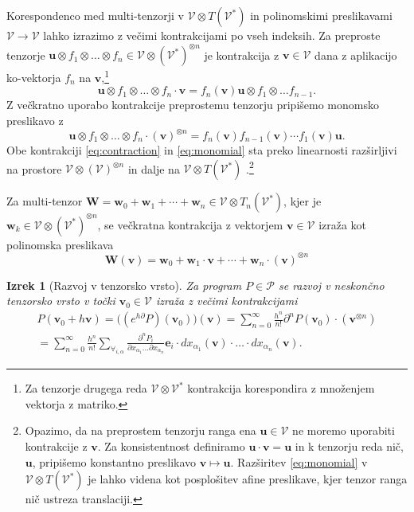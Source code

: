 \documentclass[a4paper, 12pt]{book}
\newcommand{\bfW}{\mathbf{W}}
\newcommand{\bfw}{\mathbf{w}}
\newcommand{\VV}{\mathcal{V}}
\newcommand{\e}{\mathbf{e}}
\newcommand{\uu}{\mathbf{u}}
\newcommand{\vv}{\mathbf{v}}
\newcommand{\dP}{\mathcal{P}}
\newcommand{\D}{\partial}
\newtheorem{izrek}{Izrek}[chapter]
\begin{document}
Korespondenco med multi-tenzorji v $\VV\otimes T(\VV^ *)$ in polinomskimi preslikavami $\VV\to\VV$ lahko izrazimo z večimi kontrakcijami po vseh indeksih. Za preproste tenzorje  $\uu\otimes
 f_1\otimes\ldots\otimes f_n\in \VV\otimes(\VV^*)^{\otimes n}$ je kontrakcija z $\vv\in\VV$ dana z aplikacijo ko-vektorja $f_n$ na $\vv$,\footnote{Za tenzorje drugega reda $\VV\otimes\VV^*$ kontrakcija korespondira z množenjem vektorja z matriko.}
\begin{equation}
   \label{eq:contraction}
 \uu\otimes f_1\otimes\ldots\otimes f_n\cdot \vv = f_n(\vv) \uu\otimes f_1\otimes\ldots f_{n-1}.
\end{equation}
Z večkratno uporabo kontrakcije preprostemu tenzorju pripišemo monomsko preslikavo z
 \begin{equation}
   \label{eq:monomial}
 \uu\otimes f_1\otimes\ldots\otimes f_n\cdot (\vv)^{\otimes n} = f_n(\vv)f_{n-1}(\vv)\cdots f_1(\vv) \uu.
\end{equation}
Obe kontrakciji \eqref{eq:contraction} in \eqref{eq:monomial} sta preko linearnosti razširljivi na prostore $\VV\otimes(\VV)^{\otimes n}$ in dalje na $\VV\otimes T(\VV^ *)$ .\footnote{Opazimo, da na preprostem tenzorju ranga ena
  $\uu\in\VV$ ne moremo uporabiti kontrakcije z $\vv$. Za konsistentnost definiramo $\uu\cdot \vv = \uu$ in k tenzorju reda nič, $\uu$, pripišemo konstantno preslikavo
  $\vv\mapsto \uu$. Razširitev
  \eqref{eq:monomial}
  v $\VV\otimes T(\VV^*)$ je lahko videna kot posplošitev afine preslikave,
  kjer tenzor ranga nič ustreza translaciji.}
  
  \noindent Za multi-tenzor $\bfW=\bfw_0+\bfw_1+\cdots+\bfw_n\in\VV\otimes T_n(\VV^*)$, kjer je $\bfw_k\in\VV\otimes(\VV^*)^{\otimes n}$, se večkratna kontrakcija z vektorjem $\vv\in\VV$ izraža kot polinomska preslikava
  \begin{equation}
  \label{eq:polynomial_tensor}
  \bfW(\vv)=\bfw_0+\bfw_1\cdot\vv+\cdots+\bfw_n\cdot(\vv)^{\otimes n}
  \end{equation}

\begin{izrek}[Razvoj v tenzorsko vrsto]\label{izr:e^d}
	Za program $P\in\dP$  se razvoj v neskončno tenzorsko vrsto
  v točki $\vv_0\in \VV$ izraža z večimi kontrakcijami 
	\begin{multline}\label{eq:tenzorVrsta}
	P(\vv_0+h\vv) = \Big((e^{h\D}P)(\vv_0)\Big)(\vv)
  = \sum_{n=0}^\infty\frac{h^n}{n!}\D^nP(\vv_0)\cdot (\vv^{\otimes n})\\
  = \sum_{n=0}^\infty \frac{h^n}{n!}\sum_{\forall_{i,\alpha}}\frac{\partial^nP_i}{\partial
 		    x_{\alpha_1}\ldots \partial x_{\alpha_n}}\e_i\cdot
 		  dx_{\alpha_1}(\vv)\cdot\ldots \cdot dx_{\alpha_n}(\vv).
	\end{multline}
\end{izrek}
 
\end{document}
